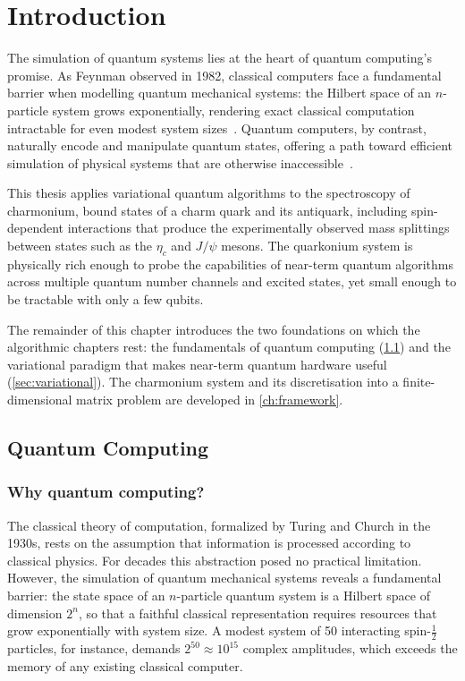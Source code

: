 \chapter{Introduction}
\label{ch:introduction}

The simulation of quantum systems lies at the heart of quantum computing's
promise. As Feynman observed in 1982, classical computers face a fundamental
barrier when modelling quantum mechanical systems: the Hilbert space of an
$n$-particle system grows exponentially, rendering exact classical computation
intractable for even modest system sizes~\cite{feynman1982}. Quantum computers,
by contrast, naturally encode and manipulate quantum states, offering a path
toward efficient simulation of physical systems that are otherwise
inaccessible~\cite{nielsen2010}.

This thesis applies variational quantum algorithms to the spectroscopy of
charmonium, bound states of a charm quark and its antiquark, including
spin-dependent interactions that produce the experimentally observed mass
splittings between states such as the $\eta_c$ and $J/\psi$ mesons. The
quarkonium system is physically rich enough to probe the capabilities of
near-term quantum algorithms across multiple quantum number channels and excited
states, yet small enough to be tractable with only a few qubits.

The remainder of this chapter introduces the two foundations on which the
algorithmic chapters rest: the fundamentals of quantum computing
(\cref{sec:qc}) and the variational paradigm that makes near-term quantum
hardware useful (\cref{sec:variational}). The charmonium system and its
discretisation into a finite-dimensional matrix problem are developed in
\cref{ch:framework}.


\section{Quantum Computing}
\label{sec:qc}

\subsection{Why quantum computing?}
\label{sec:why_qc}

The classical theory of computation, formalized by Turing and Church in the
1930s, rests on the assumption that information is processed according to
classical physics. For decades this abstraction posed no practical limitation.
However, the simulation of quantum mechanical systems reveals a fundamental
barrier: the state space of an $n$-particle quantum system is a Hilbert space of
dimension $2^n$, so that a faithful classical representation requires resources
that grow exponentially with system size. A modest system of 50 interacting
spin-$\tfrac{1}{2}$ particles, for instance, demands $2^{50}\approx 10^{15}$
complex amplitudes, which exceeds the memory of any existing classical computer.

